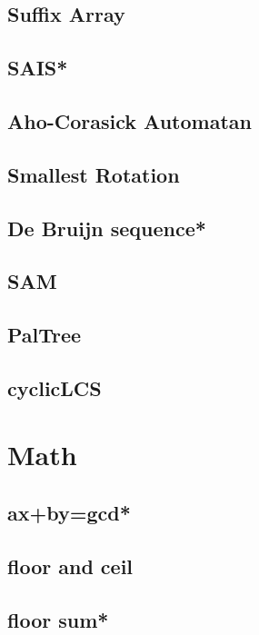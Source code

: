 \subsection{Suffix Array}

\subsection{SAIS*}

\subsection{Aho-Corasick Automatan}

\subsection{Smallest Rotation}

\subsection{De Bruijn sequence*} %

\subsection{SAM}

\subsection{PalTree}

\subsection{cyclicLCS}



\section{Math}
\subsection{ax+by=gcd*} %

\subsection{floor and ceil}

\subsection{floor sum*} %

